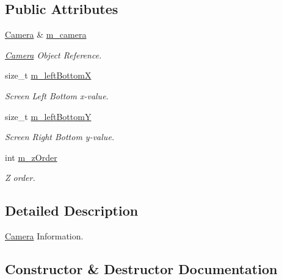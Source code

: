 \subsection*{Public Attributes}
\begin{DoxyCompactItemize}
\item 
\mbox{\label{structCameraInfo_a37cdbd4b4c81c6cfcb302651e16d253b}} 
\hyperlink{classCamera}{Camera} \& \hyperlink{structCameraInfo_a37cdbd4b4c81c6cfcb302651e16d253b}{m\+\_\+camera}
\begin{DoxyCompactList}\small\item\em \hyperlink{classCamera}{Camera} Object Reference. \end{DoxyCompactList}\item 
\mbox{\label{structCameraInfo_ab3933b7d9bbbba4a5fe6d4a7b377a747}} 
size\+\_\+t \hyperlink{structCameraInfo_ab3933b7d9bbbba4a5fe6d4a7b377a747}{m\+\_\+left\+BottomX}
\begin{DoxyCompactList}\small\item\em Screen Left Bottom x-\/value. \end{DoxyCompactList}\item 
\mbox{\label{structCameraInfo_a66ba9efc00aa351d35336e2971921f0e}} 
size\+\_\+t \hyperlink{structCameraInfo_a66ba9efc00aa351d35336e2971921f0e}{m\+\_\+left\+BottomY}
\begin{DoxyCompactList}\small\item\em Screen Right Bottom y-\/value. \end{DoxyCompactList}\item 
\mbox{\label{structCameraInfo_a7d129efd3cef38dfcffb37feacdbea41}} 
int \hyperlink{structCameraInfo_a7d129efd3cef38dfcffb37feacdbea41}{m\+\_\+z\+Order}
\begin{DoxyCompactList}\small\item\em Z order. \end{DoxyCompactList}\end{DoxyCompactItemize}


\subsection{Detailed Description}
\hyperlink{classCamera}{Camera} Information. 

\subsection{Constructor \& Destructor Documentation}
\mbox{\label{structCameraInfo_acaeb61d27869ecca978751caf05b4e22}} 
